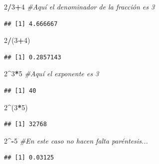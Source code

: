 \documentclass[]{book}
\newenvironment{Shaded}{\begin{snugshade}}{\end{snugshade}}
\newcommand{\CommentTok}[1]{\textcolor[rgb]{0.56,0.35,0.01}{\textit{#1}}}
\newcommand{\DecValTok}[1]{\textcolor[rgb]{0.00,0.00,0.81}{#1}}
\newcommand{\NormalTok}[1]{#1}
\newcommand{\OperatorTok}[1]{\textcolor[rgb]{0.81,0.36,0.00}{\textbf{#1}}}
\theoremstyle{definition}
\theoremstyle{definition}
\theoremstyle{definition}
\theoremstyle{remark}
\begin{document}
\begin{Shaded}
\begin{Highlighting}[]
\DecValTok{2}\OperatorTok{/}\DecValTok{3}\OperatorTok{+}\DecValTok{4} \CommentTok{#Aquí el denominador de la fracción es 3}
\end{Highlighting}
\end{Shaded}

\begin{verbatim}
## [1] 4.666667
\end{verbatim}

\begin{Shaded}
\begin{Highlighting}[]
\DecValTok{2}\OperatorTok{/}\NormalTok{(}\DecValTok{3}\OperatorTok{+}\DecValTok{4}\NormalTok{)}
\end{Highlighting}
\end{Shaded}

\begin{verbatim}
## [1] 0.2857143
\end{verbatim}

\begin{Shaded}
\begin{Highlighting}[]
\DecValTok{2}\OperatorTok{^}\DecValTok{3}\OperatorTok{*}\DecValTok{5} \CommentTok{#Aquí el exponente es 3}
\end{Highlighting}
\end{Shaded}

\begin{verbatim}
## [1] 40
\end{verbatim}

\begin{Shaded}
\begin{Highlighting}[]
\DecValTok{2}\OperatorTok{^}\NormalTok{(}\DecValTok{3}\OperatorTok{*}\DecValTok{5}\NormalTok{)}
\end{Highlighting}
\end{Shaded}

\begin{verbatim}
## [1] 32768
\end{verbatim}

\begin{Shaded}
\begin{Highlighting}[]
\DecValTok{2}\OperatorTok{^-}\DecValTok{5}  \CommentTok{#En este caso no hacen falta paréntesis...}
\end{Highlighting}
\end{Shaded}

\begin{verbatim}
## [1] 0.03125
\end{verbatim}
\end{document}
